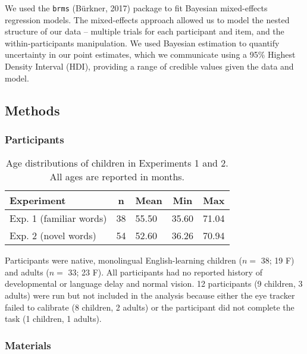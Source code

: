 \documentclass[10pt, letterpaper]{article}
\begin{document}
We used the \texttt{brms} (Bürkner, 2017) package to fit Bayesian
mixed-effects regression models. The mixed-effects approach allowed us
to model the nested structure of our data -- multiple trials for each
participant and item, and the within-participants manipulation. We used
Bayesian estimation to quantify uncertainty in our point estimates,
which we communicate using a 95\% Highest Density Interval (HDI),
providing a range of credible values given the data and model.

\hypertarget{methods}{%
\subsection{Methods}\label{methods}}

\hypertarget{participants}{%
\subsubsection{Participants}\label{participants}}

\begin{table}[tbp]
\begin{center}
\begin{threeparttable}
\caption{\label{tab:make-ss-table}Age distributions of children in Experiments 1 and 2. All ages are reported in months.}
\begin{tabular}{lllll}
\toprule
Experiment & \multicolumn{1}{c}{n} & \multicolumn{1}{c}{Mean} & \multicolumn{1}{c}{Min} & \multicolumn{1}{c}{Max}\\
\midrule
Exp. 1 (familiar words) & 38 & 55.50 & 35.60 & 71.04\\
Exp. 2 (novel words) & 54 & 52.60 & 36.26 & 70.94\\
\bottomrule
\end{tabular}
\end{threeparttable}
\end{center}
\end{table}

Participants were native, monolingual English-learning children (\(n=\)
38; 19 F) and adults (\(n=\) 33; 23 F). All participants had no reported
history of developmental or language delay and normal vision. 12
participants (9 children, 3 adults) were run but not included in the
analysis because either the eye tracker failed to calibrate (8 children,
2 adults) or the participant did not complete the task (1 children, 1
adults).

\hypertarget{materials}{%
\subsubsection{Materials}\label{materials}}
\end{document}
